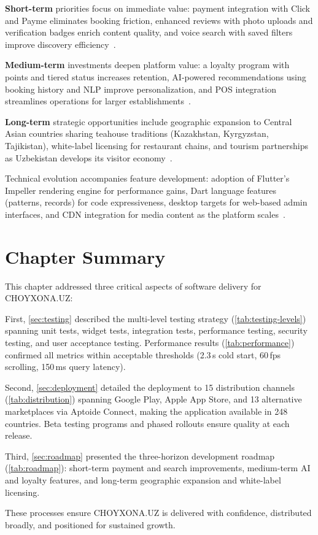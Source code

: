 \textbf{Short-term} priorities focus on immediate value: payment integration with Click and Payme eliminates booking friction, enhanced reviews with photo uploads and verification badges enrich content quality, and voice search with saved filters improve discovery efficiency~\cite{gartner2023}.

\textbf{Medium-term} investments deepen platform value: a loyalty program with points and tiered status increases retention, AI-powered recommendations using booking history and NLP improve personalization, and POS integration streamlines operations for larger establishments~\cite{opentable2023}.

\textbf{Long-term} strategic opportunities include geographic expansion to Central Asian countries sharing teahouse traditions (Kazakhstan, Kyrgyzstan, Tajikistan), white-label licensing for restaurant chains, and tourism partnerships as Uzbekistan develops its visitor economy~\cite{statista2024}.

Technical evolution accompanies feature development: adoption of Flutter's Impeller rendering engine for performance gains, Dart language features (patterns, records) for code expressiveness, desktop targets for web-based admin interfaces, and CDN integration for media content as the platform scales~\cite{flutter_arch2024}.


\section{Chapter Summary}
\label{sec:ch4-summary}

This chapter addressed three critical aspects of software delivery for CHOYXONA.UZ:

First, \cref{sec:testing} described the multi-level testing strategy (\cref{tab:testing-levels}) spanning unit tests, widget tests, integration tests, performance testing, security testing, and user acceptance testing.
Performance results (\cref{tab:performance}) confirmed all metrics within acceptable thresholds (2.3\,s cold start, 60\,fps scrolling, 150\,ms query latency).

Second, \cref{sec:deployment} detailed the deployment to 15 distribution channels (\cref{tab:distribution}) spanning Google Play, Apple App Store, and 13 alternative marketplaces via Aptoide Connect, making the application available in 248 countries.
Beta testing programs and phased rollouts ensure quality at each release.

Third, \cref{sec:roadmap} presented the three-horizon development roadmap (\cref{tab:roadmap}): short-term payment and search improvements, medium-term AI and loyalty features, and long-term geographic expansion and white-label licensing.

These processes ensure CHOYXONA.UZ is delivered with confidence, distributed broadly, and positioned for sustained growth.
